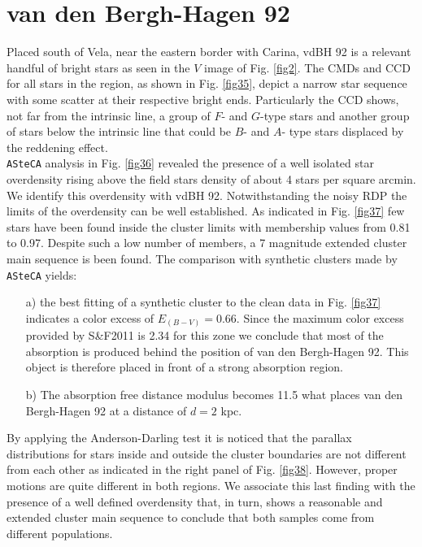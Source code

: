 \documentclass[draft]{aa}
\begin{document}
\section{van den Bergh-Hagen 92}

Placed south of Vela, near the eastern border with Carina, vdBH
92 is a relevant handful of bright stars as seen in the $V$ image of Fig.
\ref{fig2}. The CMDs and CCD for all stars in the region, as shown in Fig.
\ref{fig35}, depict a narrow star sequence with some scatter at their respective
bright ends. Particularly the CCD shows, not far from the intrinsic line, a
group of $F$- and $G$-type stars and another group of stars below the intrinsic
line that could be $B$- and $A$- type stars displaced by the reddening effect.\\

\texttt{ASteCA} analysis in Fig. \ref{fig36} revealed the presence of a well
isolated star overdensity rising above the field stars density of about 4
stars per square arcmin. We identify this overdensity with vdBH
92. Notwithstanding the noisy RDP the limits of the overdensity can be well
established. As indicated in Fig. \ref{fig37} few stars have been found inside
the cluster limits with membership values from 0.81 to 0.97. Despite such a low
number of members, a 7 magnitude extended cluster main sequence is been found.
The comparison with synthetic clusters made by \texttt{ASteCA} yields:

\begin{itemize}
\item [a)] the best fitting of a synthetic cluster to the clean data in Fig. 
    \ref{fig37} indicates a color excess of $E_{(B-V)} = 0.66$. Since the
    maximum color excess provided by S\&F2011 is 2.34 for this zone we
    conclude that most of the absorption is produced behind the position of van
    den Bergh-Hagen 92. This object is therefore placed in front of a strong
    absorption region.
\item [b)] The absorption free distance modulus becomes 11.5 what places van den
    Bergh-Hagen 92 at a distance of $d=2$ kpc.
\end{itemize}

By applying the Anderson-Darling test it is noticed that the parallax
distributions for stars inside and outside the cluster boundaries are not
different from each other as indicated in the right panel of Fig. 
\ref{fig38}. However, proper motions are quite different in both regions. We
associate this last finding with the presence of a well defined overdensity
that, in turn, shows a reasonable and extended cluster main sequence to
conclude that both samples come from different populations.\\
\end{document}
